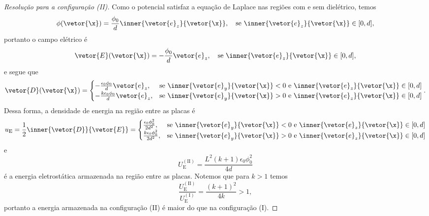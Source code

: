 \begin{proof}[Resolução para a configuração (II)]
    Como o potencial satisfaz a equação de Laplace nas regiões com e sem dielétrico, temos
    \begin{equation*}
        \phi(\vetor{\x}) = \frac{\phi_0}{d}\inner{\vetor{e}_z}{\vetor{\x}},\quad\text{se }\inner{\vetor{e}_z}{\vetor{\x}} \in [0,d],
    \end{equation*}
    portanto o campo elétrico é
    \begin{equation*}
        \vetor{E}(\vetor{\x}) = -\frac{\phi_0}{d}\vetor{e}_z,\quad\text{se }\inner{\vetor{e}_z}{\vetor{\x}} \in [0,d],
    \end{equation*}
    e segue que
    \begin{equation*}
        \vetor{D}(\vetor{\x}) = \begin{cases}
            - \frac{\epsilon_0\phi_0}{d}\vetor{e}_z,&\text{se }\inner{\vetor{e}_y}{\vetor{\x}} < 0\text{ e }\inner{\vetor{e}_z}{\vetor{\x}} \in [0,d]\\
            - \frac{k\epsilon_0\phi_0}{d}\vetor{e}_z,&\text{se }\inner{\vetor{e}_y}{\vetor{\x}} > 0\text{ e }\inner{\vetor{e}_z}{\vetor{\x}} \in [0,d]
        \end{cases}.
    \end{equation*}
    Dessa forma, a densidade de energia na região entre as placas é
    \begin{equation*}
        u_\mathrm{E} = \frac12\inner{\vetor{D}}{\vetor{E}} = \begin{cases}
            \frac{\epsilon_0\phi_0^2}{2d^2},&\text{se }\inner{\vetor{e}_y}{\vetor{\x}} < 0\text{ e }\inner{\vetor{e}_z}{\vetor{\x}} \in [0,d]\\
            \frac{k\epsilon_0\phi_0^2}{2d^2},&\text{se }\inner{\vetor{e}_y}{\vetor{\x}} > 0\text{ e }\inner{\vetor{e}_z}{\vetor{\x}} \in [0,d]
        \end{cases}
    \end{equation*}
    e
    \begin{equation*}
        U_\mathrm{E}^{\mathrm{(II)}} = \frac{L^2 (k+1)\epsilon_0 \phi_0^2}{4d}
    \end{equation*}
    é a energia eletrostática armazenada na região entre as placas. Notemos que para \(k > 1\) temos
    \begin{equation*}
        \frac{U_\mathrm{E}^{\mathrm{(II)}}}{U_\mathrm{E}^{\mathrm{(I)}}} = \frac{(k+1)^2}{4k} > 1,
    \end{equation*}
    portanto a energia armazenada na configuração (II) é maior do que na configuração (I).
\end{proof}
